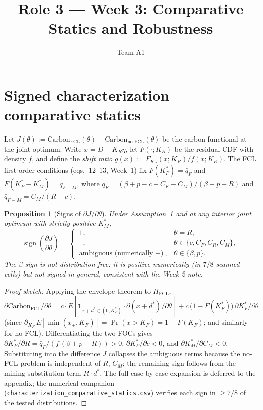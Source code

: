 \documentclass[11pt]{article}
\title{Role 3 --- Week 3: Comparative Statics and Robustness}
\author{Team A1}
\date{}
\newtheorem{proposition}{Proposition}
\begin{document}
\maketitle

\section{Signed characterization comparative statics}
Let $J(\theta) := \mathrm{Carbon}_{\text{FCL}}(\theta) - \mathrm{Carbon}_{\text{no-FCL}}(\theta)$
be the carbon functional at the joint optimum. Write $x = D - K_R \eta$,
let $F(\cdot;K_R)$ be the residual CDF with density $f$, and define the
\emph{shift ratio} $g(x) := F_{K_R}(x;K_R)/f(x;K_R)$. The FCL first-order
conditions (eqs.~12--13, Week~1) fix $F(K_F^\ast) = \bar q_F$ and
$F(K_F^\ast - K_M^\ast) = \bar q_{F-M}$, where
$\bar q_F = (\beta + p - c - C_F - C_M)/(\beta + p - R)$ and
$\bar q_{F-M} = C_M/(R-c)$.

\begin{proposition}[Signs of $\partial J/\partial \theta$]\label{prop:signs}
Under Assumption~1 and at any interior joint optimum with strictly
positive $K_M^\ast$,
\[
\operatorname{sign}\!\left(\frac{\partial J}{\partial \theta}\right)
=
\begin{cases}
+,& \theta = R,\\
-,& \theta \in \{c, C_F, C_R, C_M\},\\
\text{ambiguous (numerically $+$)},& \theta \in \{\beta, p\}.
\end{cases}
\]
The $\beta$ sign is not distribution-free: it is positive numerically (in $7/8$ scanned
cells) but not signed in general, consistent with the Week-2 note.
\end{proposition}

\begin{proof}[Proof sketch]
Applying the envelope theorem to $\Pi_{\text{FCL}}$,
$\partial \mathrm{Carbon}_{\text{FCL}}/\partial \theta
= c \cdot E[\mathbf 1_{x+d^\ast \in (0,K_F^\ast)} \cdot \partial (x+d^\ast)/\partial \theta]
+ c \,\bigl(1-F(K_F^\ast)\bigr)\, \partial K_F^\ast/\partial \theta$
(since $\partial_{K_F}\,E[\min(x_+,K_F)]=\Pr(x>K_F)=1-F(K_F)$; and similarly for no-FCL). Differentiating the two FOCs gives
$\partial K_F^\ast/\partial R = \bar q_F/(f\,(\beta+p-R)) > 0$,
$\partial K_F^\ast/\partial c < 0$, and $\partial K_M^\ast/\partial C_M < 0$.
Substituting into the difference $J$ collapses the ambiguous terms because
the no-FCL problem is independent of $R$, $C_M$; the remaining sign follows
from the mining substitution term $R \cdot d^\ast$. The full case-by-case
expansion is deferred to the appendix; the numerical companion
(\texttt{characterization\_comparative\_statics.csv}) verifies each sign in
$\ge 7/8$ of the tested distributions.
\end{proof}
\end{document}
